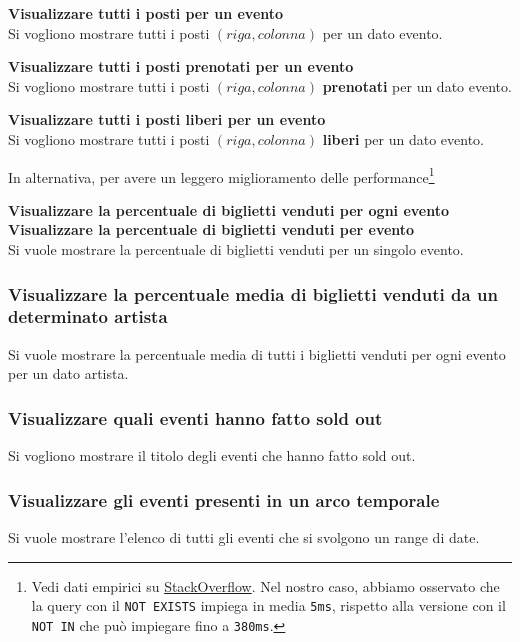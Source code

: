 \documentclass[a4paper,11pt]{article}
\begin{document}
\textbf{Visualizzare tutti i posti per un evento}\\
Si vogliono mostrare tutti i posti $(riga, colonna)$ per un dato evento.

\textbf{Visualizzare tutti i posti prenotati per un evento}\\
Si vogliono mostrare tutti i posti $(riga, colonna)$ \textbf{prenotati} per un dato evento.

\textbf{Visualizzare tutti i posti liberi per un evento}\\
Si vogliono mostrare tutti i posti $(riga, colonna)$ \textbf{liberi} per un dato evento.


In alternativa, per avere un leggero miglioramento delle performance\footnote{
Vedi dati empirici su \href{https://stackoverflow.com/a/66785790}{StackOverflow}.
Nel nostro caso, abbiamo osservato che la query con il \texttt{NOT EXISTS}
impiega in media \texttt{5ms}, rispetto alla versione con il \texttt{NOT IN}
che pu\`o impiegare fino a \texttt{380ms}.}


\textbf{Visualizzare la percentuale di biglietti venduti per ogni evento}\\


\textbf{Visualizzare la percentuale di biglietti venduti per evento}\\
Si vuole mostrare la percentuale di biglietti venduti per un singolo evento.


\subsubsection{Visualizzare la percentuale media di biglietti venduti da un determinato artista}
Si vuole mostrare la percentuale media di tutti i biglietti venduti per ogni
evento per un dato artista.


\subsubsection{Visualizzare quali eventi hanno fatto sold out}
Si vogliono mostrare il titolo degli eventi che hanno fatto sold out.

 
\subsubsection{Visualizzare gli eventi presenti in un arco temporale}
Si vuole mostrare l'elenco di tutti gli eventi che si svolgono un range di date.

\end{document}
